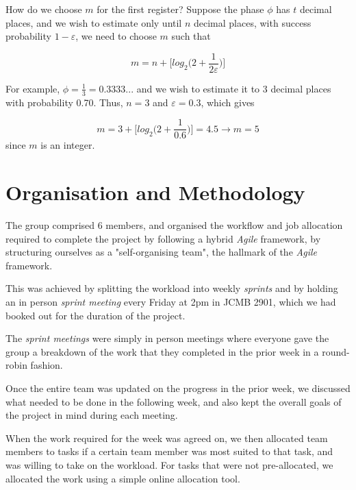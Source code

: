 \documentclass{article}
\begin{document}
\vspace{10mm} 

\noindent 
How do we choose $m$ for the first register? Suppose the phase $\phi$ has $t$ decimal places, and we wish to estimate only until $n$ decimal places, with success probability $1-\varepsilon$, we need to choose $m$ such that \cite{nielsen_quantum_2010}
\vspace{5mm}

\begin{equation}
m=n+\bigg[log_2\bigg(2+\frac{1}{2\varepsilon}\bigg)\bigg]    
\end{equation}

For example, $\phi = \frac{1}{3} = 0.3333...$ and we wish to estimate it to 3 decimal places with probability 0.70. Thus, $n=3$ and $\varepsilon = 0.3$, which gives 
\vspace{5mm}

\begin{equation}
m = 3 + \bigg[log_2\bigg(2+\frac{1}{0.6}\bigg)\bigg]=4.5 \rightarrow m=5    
\end{equation} since $m$ is an integer.

\pagebreak

\section{Organisation and Methodology}

The group comprised 6 members, and organised the workflow and job allocation required to complete the project by following a hybrid \textit{Agile}\cite{noauthor_manifesto_nodate} framework, by structuring ourselves as a "self-organising team", the hallmark of the \textit{Agile} framework.

This was achieved by splitting the workload into weekly \textit{sprints} and by holding an in person \textit{sprint meeting} every Friday at 2pm in JCMB 2901, which we had booked out for the duration of the project.

The \textit{sprint meetings} were simply in person meetings where everyone gave the group a breakdown of the work that they completed in the prior week in a round-robin fashion.

Once the entire team was updated on the progress in the prior week, we discussed what needed to be done in the following week, and also kept the overall goals of the project in mind during each meeting.

When the work required for the week was agreed on, we then allocated team members to tasks if a certain team member was most suited to that task, and was willing to take on the workload. For tasks that were not pre-allocated, we allocated the work using a simple online allocation tool.
\end{document}
